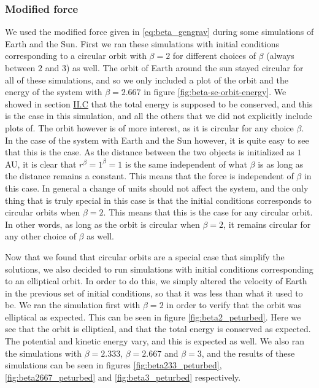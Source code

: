 \documentclass[reprint,english,notitlepage]{revtex4-1}  %
\begin{document}
\subsubsection{Modified force} \label{sec:V:b:ii}

We used the modified force given in \eqref{eq:beta_gengrav} during some simulations of Earth and the Sun. First we ran these simulations with initial conditions corresponding to a circular orbit with $\beta = 2$ for different choices of $\beta$ (always between $2$ and $3$) as well. The orbit of Earth around the sun stayed circular for all of these simulations, and so we only included a plot of the orbit and the energy of the system with $\beta = 2.667$ in figure \ref{fig:beta-se-orbit-energy}. We showed in section \hyperref[sec:II:c]{II.C} that the total energy is supposed to be conserved, and this is the case in this simulation, and all the others that we did not explicitly include plots of. The orbit however is of more interest, as it is circular for any choice $\beta$. In the case of the system with Earth and the Sun however, it is quite easy to see that this is the case. As the distance between the two objects is initialized as $1$ AU, it is clear that $r^\beta = 1^\beta = 1$ is the same independent of what $\beta$ is as long as the distance remains a constant. This means that the force is independent of $\beta$ in this case. In general a change of units should not affect the system, and the only thing that is truly special in this case is that the initial conditions corresponds to circular orbits when $\beta = 2$. This means that this is the case for any circular orbit. In other words, as long as the orbit is circular when $\beta = 2$, it remains circular for any other choice of $\beta$ as well.  

Now that we found that circular orbits are a special case that simplify the solutions, we also decided to run simulations with initial conditions corresponding to an elliptical orbit. In order to do this, we simply altered the velocity of Earth in the previous set of initial conditions, so that it was less than what it used to be. We ran the simulation first with $\beta = 2$ in order to verify that the orbit was elliptical as expected. This can be seen in figure \ref{fig:beta2_peturbed}. Here we see that the orbit is elliptical, and that the total energy is conserved as expected. The potential and kinetic energy vary, and this is expected as well. We also ran the simulations with $\beta = 2.333$, $\beta = 2.667$ and $\beta = 3$, and the results of these simulations can be seen in figures \ref{fig:beta233_peturbed}, \ref{fig:beta2667_peturbed} and \ref{fig:beta3_peturbed} respectively. 
\end{document}
